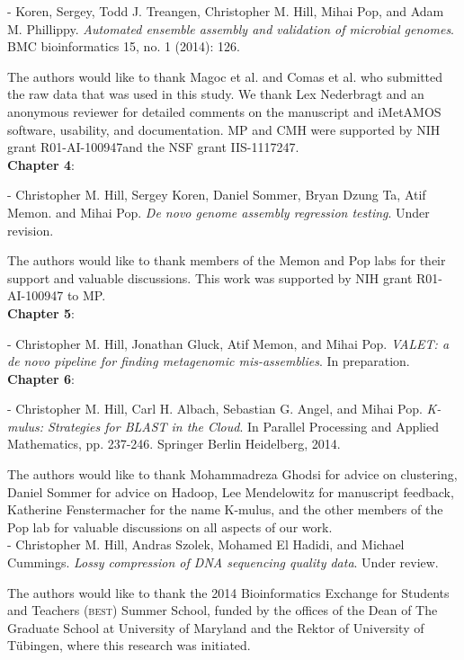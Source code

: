\noindent - Koren, Sergey, Todd J. Treangen, Christopher M. Hill, Mihai Pop, and Adam M. Phillippy. \textit{Automated ensemble assembly and validation of microbial genomes}. BMC bioinformatics 15, no. 1 (2014): 126.

The authors would like to thank Magoc et al. and Comas et al. who submitted the raw data that was used in this study. We thank Lex Nederbragt and an anonymous reviewer for detailed comments on the manuscript and iMetAMOS software, usability, and documentation.  MP and CMH were supported by NIH grant R01-AI-100947and the NSF grant IIS-1117247. \\

\noindent\textbf{Chapter 4}:

\noindent - Christopher M. Hill, Sergey Koren, Daniel Sommer, Bryan Dzung Ta, Atif Memon. and Mihai Pop. \textit{De novo genome assembly regression testing}. Under revision.

The authors would like to thank members of the Memon and Pop labs for their support and valuable discussions. This work was supported by NIH grant R01-AI-100947 to MP. \\

\noindent\textbf{Chapter 5}:

\noindent - Christopher M. Hill, Jonathan Gluck, Atif Memon, and Mihai Pop. \textit{VALET: a de novo pipeline for finding metagenomic mis-assemblies}. In preparation. \\

\noindent\textbf{Chapter 6}:

\noindent - Christopher M. Hill, Carl H. Albach, Sebastian G. Angel, and Mihai Pop. \textit{K-mulus: Strategies for BLAST in the Cloud}. In Parallel Processing and Applied Mathematics, pp. 237-246. Springer Berlin Heidelberg, 2014.

The authors would like to thank Mohammadreza Ghodsi for advice on clustering, Daniel Sommer for advice on Hadoop, Lee Mendelowitz for manuscript feedback, Katherine Fenstermacher for the name K-mulus, and the other members of the Pop lab for valuable discussions on all aspects of our work. \\

\noindent - Christopher M. Hill, Andras Szolek, Mohamed El Hadidi, and Michael Cummings. \textit{Lossy compression of DNA sequencing quality data}. Under review.

The authors would like to thank the 2014 Bioinformatics
Exchange for Students and Teachers (\textsc{best}) Summer School,
funded by the offices of the Dean of The Graduate School at University
of Maryland and the Rektor of University of T\"{u}bingen, where this
research was initiated.
